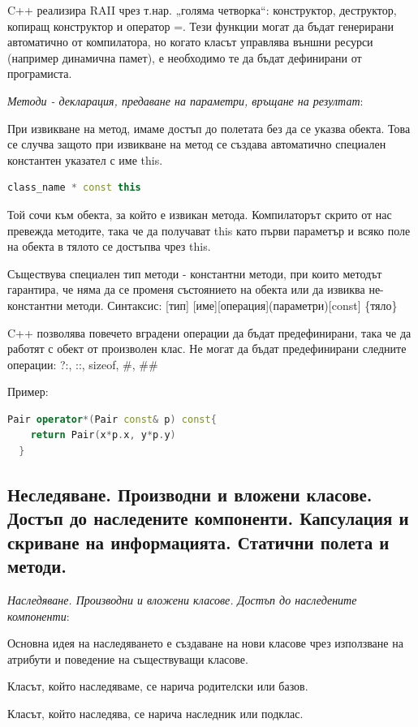 \documentclass{article}
\renewcommand{\\}{\newline}
\begin{document}
C++ реализира RAII чрез т.нар. „голяма четворка“: конструктор, деструктор, копиращ конструктор и оператор =. Тези функции могат да бъдат генерирани автоматично от компилатора, но когато класът управлява външни ресурси (например динамична памет), е необходимо те да бъдат дефинирани от програмиста.

\textit{Методи - декларация, предаване на параметри, връщане на резултат}: 

При извикване на метод, имаме достъп до полетата без да се указва обекта. Това се случва защото при извикване на метод се създава автоматично специален константен указател с име this. 
\begin{lstlisting}[language=C++]
  class_name * const this
\end{lstlisting}

Той сочи към обекта, за който е извикан метода. Компилаторът скрито от нас превежда методите, така че да получават this като първи параметър и всяко поле на обекта в тялото се достъпва чрез this.

Съществува специален тип методи - константни методи, при които методът гарантира, че няма да се променя състоянието на обекта или да извиква не-константни методи. Синтаксис: [тип] [име][операция](параметри)[const] \{тяло\}

C++ позволява повечето вградени операции да бъдат предефинирани, така че да работят с обект от произволен клас. Не могат да бъдат предефинирани следните операции: ?:, ::, sizeof, \#, \#\#

Пример: 
\begin{lstlisting}[language=C++]
  Pair operator*(Pair const& p) const{
    return Pair(x*p.x, y*p.y)
  }
\end{lstlisting}

\subsection{Неследяване. Производни и вложени класове. Достъп до наследените компоненти. Капсулация и скриване на информацията. Статични полета и методи.}

\textit{Наследяване. Производни и вложени класове. Достъп до наследените компоненти}: 

Основна идея на наследяването е създаване на нови класове чрез използване на атрибути и поведение на съществуващи класове. 

Класът, който наследяваме, се нарича родителски или базов.

Класът, който наследява, се нарича наследник или подклас.
\end{document}
